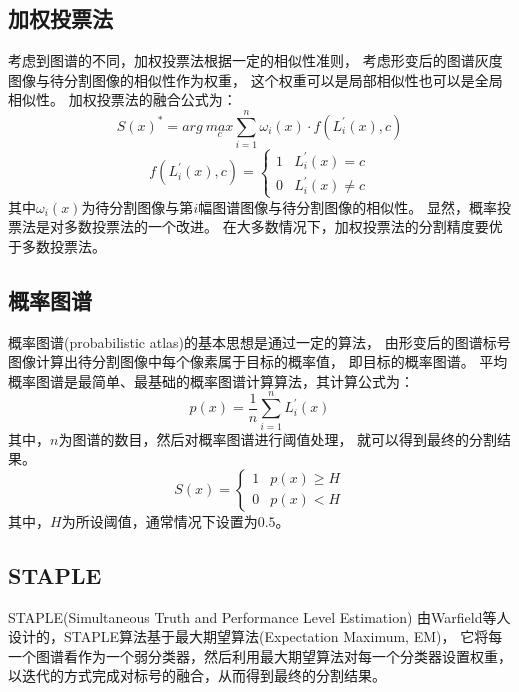 \subsection{加权投票法}
考虑到图谱的不同，加权投票法根据一定的相似性准则，
考虑形变后的图谱灰度图像与待分割图像的相似性作为权重，
这个权重可以是局部相似性也可以是全局相似性。
加权投票法的融合公式为：
\begin{equation}
  S(x)^\ast=arg\ \underset{c}{max}\sum_{i=1}^n\omega_i(x)\cdot
  f(L_i^\prime(x),c)
\end{equation}
\begin{equation}
  f(L_i^\prime(x),c)=
  \begin{cases}
    1& L_i^\prime(x)=c\\
    0& L_i^\prime(x)\ne c
  \end{cases}
\end{equation}
其中$\omega_i(x)$为待分割图像与第$i$幅图谱图像与待分割图像的相似性。
显然，概率投票法是对多数投票法的一个改进。
在大多数情况下，加权投票法的分割精度要优于多数投票法。

\subsection{概率图谱}
概率图谱(probabilistic atlas)的基本思想是通过一定的算法，
由形变后的图谱标号图像计算出待分割图像中每个像素属于目标的概率值，
即目标的概率图谱。
平均概率图谱是最简单、最基础的概率图谱计算算法，其计算公式为：
\begin{equation}
  p(x)=\frac{1}{n}\sum_{i=1}^{n}L_i^\prime(x)
\end{equation}
其中，$n$为图谱的数目，然后对概率图谱进行阈值处理，
就可以得到最终的分割结果。
\begin{equation}
  S(x)=
  \begin{cases}
    1& p(x)\ge H\\
    0& p(x)<H
  \end{cases}
\end{equation}
其中，$H$为所设阈值，通常情况下设置为$0.5$。

\subsection{STAPLE}
STAPLE(Simultaneous Truth and Performance Level Estimation)
由Warfield等人设计的，STAPLE算法基于最大期望算法(Expectation Maximum, EM)，
它将每一个图谱看作为一个弱分类器，然后利用最大期望算法对每一个分类器设置权重，
以迭代的方式完成对标号的融合，从而得到最终的分割结果。


